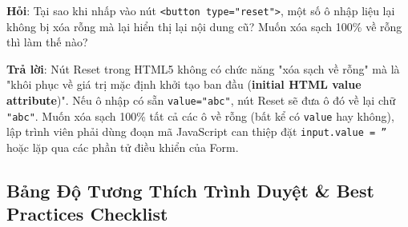 \documentclass[11pt,oneside]{book}
\newcommand{\thd}[1]{\textcolor{white}{\textbf{\strut #1}}}
\newcommand{\codeinline}[1]{\textcolor{accentOrange}{\texttt{#1}}}
\newcommand{\term}[1]{\textbf{\textcolor{primaryBlue}{#1}}}
\begin{document}
\begin{noteBox}
\textbf{Hỏi}: Tại sao khi nhấp vào nút \codeinline{<button type="reset">}, một số ô nhập liệu lại không bị xóa rỗng mà lại hiển thị lại nội dung cũ? Muốn xóa sạch 100\% về rỗng thì làm thế nào?
\par\vspace{3pt}
\textbf{Trả lời}: Nút Reset trong HTML5 không có chức năng "xóa sạch về rỗng" mà là "khôi phục về giá trị mặc định khởi tạo ban đầu (\term{initial HTML value attribute})". Nếu ô nhập có sẵn \codeinline{value="abc"}, nút Reset sẽ đưa ô đó về lại chữ \codeinline{"abc"}. Muốn xóa sạch 100\% tất cả các ô về rỗng (bất kể có \codeinline{value} hay không), lập trình viên phải dùng đoạn mã JavaScript can thiệp đặt \codeinline{input.value = ''} hoặc lặp qua các phần tử điều khiển của Form.
\end{noteBox}

\subsection{Bảng Độ Tương Thích Trình Duyệt \& Best Practices Checklist}

\begin{prettyTableBox}
\end{prettyTableBox}
\end{document}
